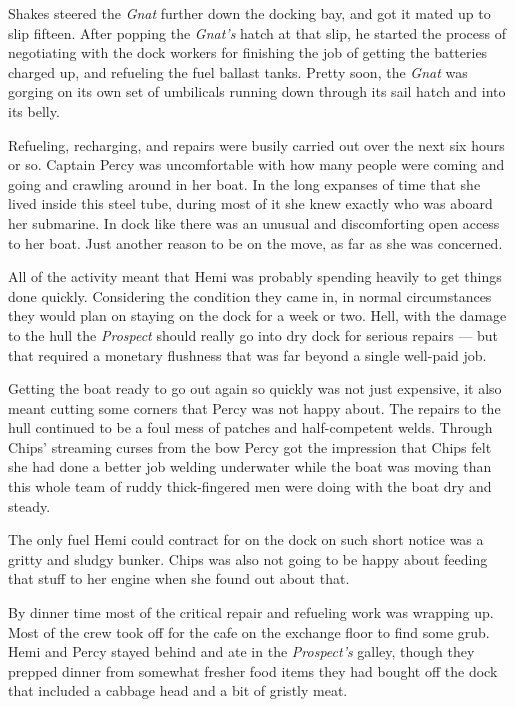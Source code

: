 \documentclass[]{scrbook}
\begin{document}
Shakes steered the \emph{Gnat} further down the docking bay, and got it
mated up to slip fifteen. After popping the \emph{Gnat's} hatch at that
slip, he started the process of negotiating with the dock workers for
finishing the job of getting the batteries charged up, and refueling the
fuel ballast tanks. Pretty soon, the \emph{Gnat} was gorging on its own
set of umbilicals running down through its sail hatch and into its
belly.

Refueling, recharging, and repairs were busily carried out over the next
six hours or so. Captain Percy was uncomfortable with how many people
were coming and going and crawling around in her boat. In the long
expanses of time that she lived inside this steel tube, during most of
it she knew exactly who was aboard her submarine. In dock like there was
an unusual and discomforting open access to her boat. Just another
reason to be on the move, as far as she was concerned.

All of the activity meant that Hemi was probably spending heavily to get
things done quickly. Considering the condition they came in, in normal
circumstances they would plan on staying on the dock for a week or two.
Hell, with the damage to the hull the \emph{Prospect} should really go
into dry dock for serious repairs --- but that required a monetary
flushness that was far beyond a single well-paid job.

Getting the boat ready to go out again so quickly was not just
expensive, it also meant cutting some corners that Percy was not happy
about. The repairs to the hull continued to be a foul mess of patches
and half-competent welds. Through Chips' streaming curses from the bow
Percy got the impression that Chips felt she had done a better job
welding underwater while the boat was moving than this whole team of
ruddy thick-fingered men were doing with the boat dry and steady.

The only fuel Hemi could contract for on the dock on such short notice
was a gritty and sludgy bunker. Chips was also not going to be happy
about feeding that stuff to her engine when she found out about that.

By dinner time most of the critical repair and refueling work was
wrapping up. Most of the crew took off for the cafe on the exchange
floor to find some grub. Hemi and Percy stayed behind and ate in the
\emph{Prospect's} galley, though they prepped dinner from somewhat
fresher food items they had bought off the dock that included a cabbage
head and a bit of gristly meat.
\end{document}
